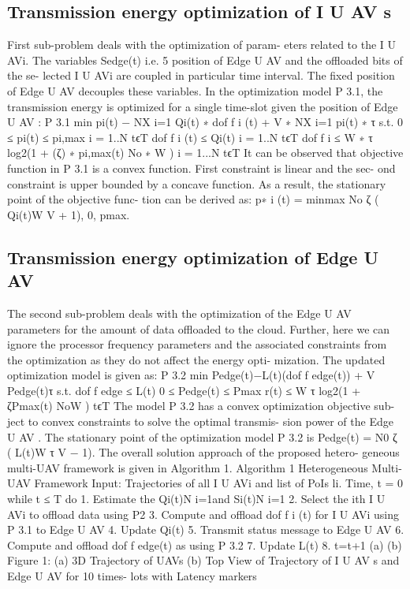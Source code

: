 \documentclass{article}
\begin{document}
\begin{multicols}{2}
\subsection{Transmission energy optimization of
I U AV s}First sub-problem deals with the optimization of param-
eters related to the I U AVi. The variables Sedge(t) i.e.
5
position of Edge U AV and the offloaded bits of the se-
lected I U AVi are coupled in particular time interval. The
fixed position of Edge U AV decouples these variables. In
the optimization model P 3.1, the transmission energy
is optimized for a single time-slot given the position of
Edge U AV :
P 3.1 min
pi(t) −
NX
i=1
Qi(t) ∗ dof f
i (t) + V ∗
NX
i=1
pi(t) ∗ τ
s.t.
0 ≤ pi(t) ≤ pi,max i = 1..N tϵT
dof f
i (t) ≤ Qi(t) i = 1..N tϵT
dof f
i ≤ W ∗ τ log2(1 + (ζ) ∗ pi,max(t)
No ∗ W ) i = 1...N tϵT
It can be observed that objective function in P 3.1 is a
convex function. First constraint is linear and the sec-
ond constraint is upper bounded by a concave function.
As a result, the stationary point of the objective func-
tion can be derived as: p∗
i (t) = min{max{ No
ζ ( Qi(t)W
V +
1), 0}, pmax}.
\subsection{Transmission energy optimization of
Edge U AV}
The second sub-problem deals with the optimization of the
Edge U AV parameters for the amount of data offloaded
to the cloud. Further, here we can ignore the processor
frequency parameters and the associated constraints from
the optimization as they do not affect the energy opti-
mization. The updated optimization model is given as:
P 3.2 min
Pedge(t)−L(t)(dof f
edge(t)) + V Pedge(t)τ
s.t.
dof f
edge ≤ L(t)
0 ≤ Pedge(t) ≤ Pmax
r(t) ≤ W τ log2(1 + ζPmax(t)
NoW ) tϵT
The model P 3.2 has a convex optimization objective sub-
ject to convex constraints to solve the optimal transmis-
sion power of the Edge U AV . The stationary point of the
optimization model P 3.2 is Pedge(t) = N0
ζ ( L(t)W τ
V − 1).
The overall solution approach of the proposed hetero-
geneous multi-UAV framework is given in Algorithm 1.
Algorithm 1 Heterogeneous Multi-UAV Framework
Input: Trajectories of all I U AVi and list of PoIs li.
Time, t = 0
while t ≤ T do
1. Estimate the {Qi(t)}N
i=1and {Si(t)}N
i=1
2. Select the ith I U AVi to offload data using P2
3. Compute and offload dof f
i (t) for I U AVi using P 3.1 to
Edge U AV
4. Update Qi(t)
5. Transmit status message to Edge U AV
6. Compute and offload dof f
edge(t) as using P 3.2
7. Update L(t)
8. t=t+1
(a) (b)
Figure 1: (a) 3D Trajectory of UAVs (b) Top View of
Trajectory of I U AV s and Edge U AV for 10 times-
lots with Latency markers


\end{multicols}
\end{document}
